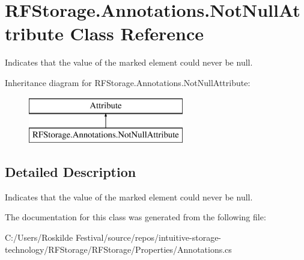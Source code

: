 \section{R\+F\+Storage.\+Annotations.\+Not\+Null\+Attribute Class Reference}
\label{class_r_f_storage_1_1_annotations_1_1_not_null_attribute}


Indicates that the value of the marked element could never be {\ttfamily null}.  


Inheritance diagram for R\+F\+Storage.\+Annotations.\+Not\+Null\+Attribute\+:\begin{figure}[H]
\begin{center}
\leavevmode
\includegraphics[height=2.000000cm]{class_r_f_storage_1_1_annotations_1_1_not_null_attribute}
\end{center}
\end{figure}


\subsection{Detailed Description}
Indicates that the value of the marked element could never be {\ttfamily null}. 


\begin{DoxyCode}{0}
\DoxyCodeLine{  \textcolor{keywordflow}{return} \textcolor{keyword}{null}; \textcolor{comment}{// Warning: Possible 'null' assignment}}
\DoxyCodeLine{\}}
\end{DoxyCode}


The documentation for this class was generated from the following file\+:\begin{DoxyCompactItemize}
\item 
C\+:/\+Users/\+Roskilde Festival/source/repos/intuitive-\/storage-\/technology/\+R\+F\+Storage/\+R\+F\+Storage/\+Properties/Annotations.\+cs\end{DoxyCompactItemize}
